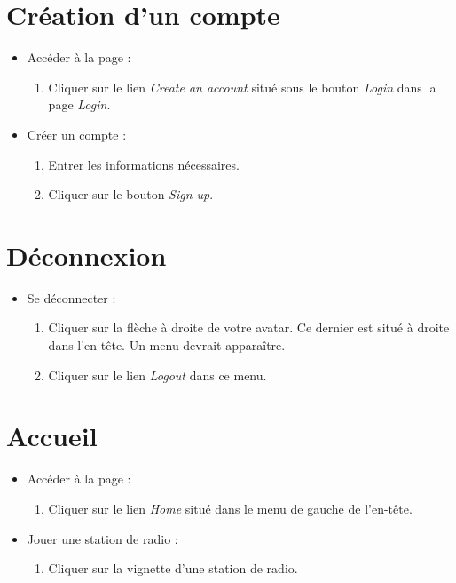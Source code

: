 \documentclass[12pt, letterpaper]{article}
\begin{document}
    \section*{Création d'un compte}
    \begin{itemize}
        \item Accéder à la page :
        \begin{enumerate}
            \item Cliquer sur le lien \textit{Create an account} situé sous le bouton \textit{Login} dans la page \textit{Login}.
        \end{enumerate}

        \item Créer un compte :
        \begin{enumerate}
            \item Entrer les informations nécessaires.
            \item Cliquer sur le bouton \textit{Sign up}.
        \end{enumerate}
    \end{itemize}

    \section*{Déconnexion}
    \begin{itemize}
    \item Se déconnecter :
        \begin{enumerate}
            \item Cliquer sur la flèche à droite de votre avatar. Ce dernier est situé à droite dans l'en-tête. Un menu devrait apparaître.
            \item Cliquer sur le lien \textit{Logout} dans ce menu.
        \end{enumerate}
    \end{itemize}

    \section*{Accueil}
    \begin{itemize}
        \item Accéder à la page :
        \begin{enumerate}
            \item Cliquer sur le lien \textit{Home} situé dans le menu de gauche de l'en-tête.
        \end{enumerate}

        \item Jouer une station de radio :
        \begin{enumerate}
            \item Cliquer sur la vignette d'une station de radio.
        \end{enumerate}
    \end{itemize}
    
\end{document}
